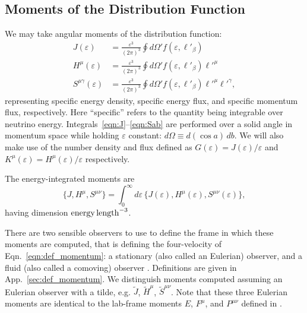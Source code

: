 \documentclass[aps,floatfix,prd,superscriptaddress,twocolumn]{revtex4-1}
\newcommand{\todo}[1]{\marginpar{\tiny{\textcolor{red}{#1}}}}
\begin{document}
\subsection{Moments of the Distribution Function}
\label{ssec:moments}
\todo{code these up}
We may take angular moments of the distribution function:
\begin{align}
  \label{eqn:J}
  J(\varepsilon) &=
  \frac{\varepsilon^3}{(2\pi)^3} \oint d\Omega' f(\varepsilon, \ell'_\beta) \\
  \label{eqn:Ha}
  H^\mu(\varepsilon) &=
  \frac{\varepsilon^3}{(2\pi)^3} \oint d\Omega' f(\varepsilon, \ell'_\beta) \ell'^\mu \\
  \label{eqn:Sab}
  S^{\mu\gamma}(\varepsilon) &=
  \frac{\varepsilon^3}{(2\pi)^3} \oint d\Omega' f(\varepsilon, \ell'_\beta) \ell'^\mu \ell'^\gamma,
\end{align}
representing specific energy density, specific energy flux, and
specific momentum flux, respectively.
Here ``specific'' refers to the quantity being integrable over neutrino energy.
\todo{relate moments to other frames?}
Integrals~\ref{eqn:J}--\ref{eqn:Sab} are performed over a solid angle in
momentum space while holding $\varepsilon$ constant:
$d\Omega \equiv d(\cos a)\,db$.
\todo{consistent with Eqn.~\ref{eqn:def_direction}?}
We will also make use of the number density and flux defined as
$G(\varepsilon)=J(\varepsilon)/\varepsilon$
and $K^\mu(\varepsilon)=H^\mu(\varepsilon)/\varepsilon$
respectively.

The energy-integrated moments are
\begin{equation}
  \label{eqn:J_H_S_eps_integrated}
  \big\{ J,H^\mu,S^{\mu\nu} \big\} = \int_0^\infty d\varepsilon \,
  \big\{ J(\varepsilon),H^\mu(\varepsilon),S^{\mu\nu}(\varepsilon) \big\},
\end{equation}
having dimension ${\rm energy}\,{\rm length}^{-3}$.

There are two sensible observers to use to define the frame in which these
moments are computed, that is defining the four-velocity of
Eqn.~\ref{eqn:def_momentum}:
a stationary (also called an Eulerian) observer,
and a fluid (also called a comoving) observer \cite{smar1980-gr_hydro}.
Definitions are given in App.~\ref{sec:def_momentum}.
We distinguish moments computed assuming an Eulerian observer with a tilde,
e.g. $\tilde{J}$, $\tilde{H}^\mu$, $\tilde{S}^{\mu\nu}$.
Note that these three Eulerian moments are identical to the lab-frame moments
$E$, $F^\mu$, and $P^{\mu\nu}$
defined in
\cite{shib2011-truncated_moment, ocon2015-gr1d_with_nu, fouc2015-m1_nsbh}.
\end{document}
